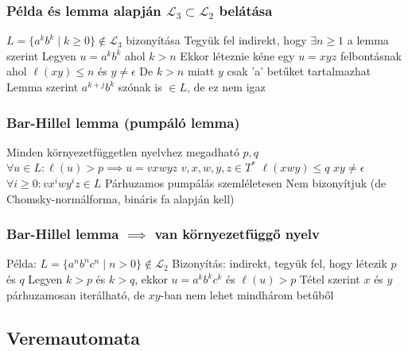 \documentclass[12pt,a4paper]{article}
\begin{document}
\subsubsection{Példa és lemma alapján $\mathcal{L}_3 \subset \mathcal{L}_2$ belátása}

\begin{outline}
	\1 $L=\{ a^k b^k \;|\; k \ge 0 \} \notin \mathcal{L}_3$ bizonyítása
	\1 Tegyük fel indirekt, hogy $\exists n \ge 1$ a lemma szerint
	\1 Legyen $u=a^k b^k$ ahol $k > n$
	\1 Ekkor léteznie kéne egy $u = xyz$ felbontásnak ahol $\ell(xy) \le n$ és $y \ne \epsilon$
	\1 De $k > n$ miatt $y$ csak 'a' betűket tartalmazhat
	\1 Lemma szerint $a^{k+j}b^k$ szónak is $\in L$, de ez nem igaz
\end{outline}

\pagebreak

\subsubsection{Bar-Hillel lemma (pumpáló lemma)}

\begin{outline}
	\1 Minden környezetfüggetlen nyelvhez megadható $p,q$
	\1 $\forall u \in L: \ell(u) > p \implies u = vxwyz$
		\2 $v,x,w,y,z \in T^*$
		\2 $\ell(xwy) \le q$
		\2 $xy \ne \epsilon$
		\2 $\forall i \ge 0: v x^i w y^i z \in L$
	\1 Párhuzamos pumpálás szemléletesen
	\1 Nem bizonyítjuk (de Chomsky-normálforma, bináris fa alapján kell)
\end{outline}

\subsubsection{Bar-Hillel lemma $\implies$ van környezetfüggő nyelv}

\begin{outline}
	\1 Példa: $L = \{ a^n b^n c^n \;|\; n > 0 \} \notin \mathcal{L}_2$
	\1 Bizonyítás: indirekt, tegyük fel, hogy létezik $p$ és $q$
	\1 Legyen $k >p$ és $k > q$, ekkor $u = a^k b^k c^k$ és $\ell(u) > p$
	\1 Tétel szerint $x$ és $y$ párhuzamosan iterálható, de $xy$-ban nem lehet mindhárom betűből
\end{outline}

\pagebreak

\subsection{Veremautomata}
\end{document}
